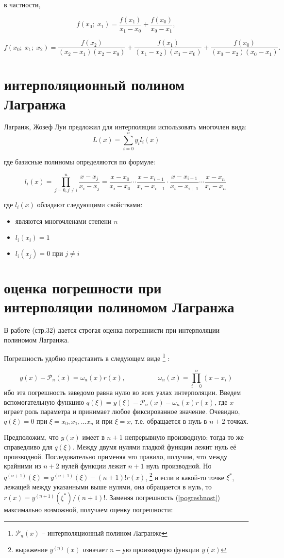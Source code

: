 \documentclass[russian,utf8,nocolumnxxxi,nocolumnxxxii]{eskdtext}
\begin{document}
в частности,

$$f(x_0;\;x_1)=\frac{f(x_1)}{x_1-x_0}+\frac{f(x_0)}{x_0-x_1} ,$$

$$f(x_0;\;x_1;\;x_2) = \frac{f(x_2)}{(x_2-x_1)(x_2-x_0)}+\frac{f(x_1)}{(x_1-x_2)(x_1-x_0)}+\frac{f(x_0)}{(x_0-x_2)(x_0-x_1)} .$$

\section{интерполяционный полином Лагранжа}
Лагранж, Жозеф Луи предложил для интерполяции использовать многочлен вида:
$$
L(x) = \sum_{i=0}^n y_i l_i(x)
$$

где базисные полиномы определяются по формуле:

$$l_i(x)=\prod_{j=0, j\neq i}^{n} \frac{x-x_j}{x_i-x_j} = \frac{x-x_0}{x_i-x_0} \cdots \frac{x-x_{i-1}}{x_i-x_{i-1}} \cdot \frac{x-x_{i+1}}{x_i-x_{i+1}} \cdots \frac{x-x_{n}}{x_i-x_{n}}\,\!$$

где $l_i(x)$ обладают следующими свойствами:
\begin{itemize}
\item являются многочленами степени $n$
\item $l_i(x_i) = 1$
\item $l_i(x_j) = 0$ при $j \neq i$
\end{itemize}


\section{оценка погрешности при интерполяции полиномом Лагранжа}
В работе \cite{spline2} (стр.32)  дается строгая оценка погрешнисти при интерполяции полиномом Лагранжа.


Погрешность удобно представить в следующем виде
\footnote{$\mathcal{P}_n(x)$ -- интерполяционный полином Лагранже}
:

\begin{equation}
y(x) - \mathcal{P}_n(x) = \omega_n(x) r(x),
\hspace{2cm}
\omega_n(x) = \prod\limits_{i=0}^n (x-x_i)
\label{pogreshnost}
\end{equation}
ибо эта погрешность заведомо равна нулю во всех узлах интерполяции.
Введем вспомогательную функцию $q(\xi) = y(\xi) - \mathcal{P}_n(x) - \omega_n(x) r(x)$,
где $x$ играет роль параметра и принимает любое фиксированное значение.
Очевидно, $q(\xi) = 0$ при $\xi=x_0,x_1,...x_n$ и при $\xi=x$, т.е. обращается в нуль
в $n+2$ точках.

Предположим, что $y(x)$ имеет в $n+1$ непрерывную производную; тогда то же справедливо
для $q(\xi)$. Между двумя нулями гладкой функции лежит нуль её производной.
Последовательно применяя это правило, получим, что между крайними из $n+2$ нулей функции
лежит $n+1$ нуль производной. Но $q^(n+1)(\xi) = y^(n+1)(\xi) - (n+1)! r(x)$,
\footnote{выражение $y^{(n)}(x)$ означает $n-$ую производную функции $y(x)$}
 и если в какой-то точке $\xi^*$, лежащей между указанными выше нулями, она обращается в нуль,
то $r(x)=y^(n+1)(\xi^*)/(n+1)!$. Заменяя погрешность (\ref{pogreshnost}) максимально
возможной, получаем оценку погрешности: 
\end{document}
